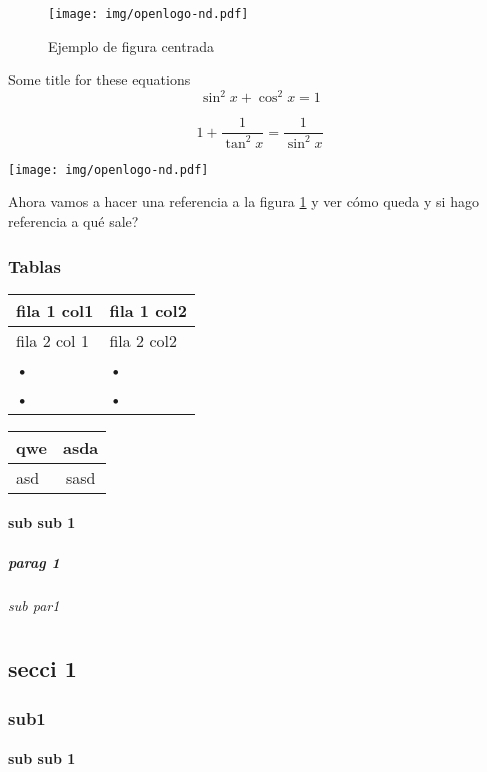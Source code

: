 \documentclass[12pt,a4paper,openany]{book}
\begin{document}
\begin{figure}
	\centering
	\texttt{[image: img/openlogo-nd.pdf]}
	\caption{Ejemplo de figura centrada}
	\label{fig:logo}
\end{figure}

\begin{tcolorbox}{Some title for these equations}
\[ \sin^2x+\cos^2x=1\]

\[ 1 + \frac{1}{\tan^2x}=\frac{1}{\sin^2x}\]
\end{tcolorbox}


\begin{tcolorbox}
	\centering
	\texttt{[image: img/openlogo-nd.pdf]}
\end{tcolorbox}


Ahora vamos a hacer una referencia a la figura \ref{fig:logo} y ver cómo queda y si hago referencia a \pageref{fig:logo} qué sale?
	

\Blindtext[1]


\subsection{Tablas}

\begin{tabular}{|p{3cm}|p{10cm}|}
\hline 
fila 1 col1  & fila 1 col2 \\ 
\hline 
fila 2 col 1 & fila 2 col2  \\ 
\hline 
• & • \\ 
\hline 
• & • \\ 
\hline 
\end{tabular} 

\begin{tabular}{|p{1cm}|c|}
\hline 
\rule[-1cm]{0pt}{1cm} qwe & asda \\ 
\hline 
\rule[-1ex]{0pt}{2.5ex} asd  & sasd \\ 
\hline 
\end{tabular} 



\subsubsection{sub sub 1}
\Blindtext[3]
\paragraph{parag 1}
\Blindtext[3]
\subparagraph{sub par1}
\Blindtext[3]

	





\chapter{}
\Blindtext[3]
\section{secci 1}
\Blindtext[3]
\subsection{sub1}
\Blindtext[3]
\subsubsection{sub sub 1}
\end{document}

